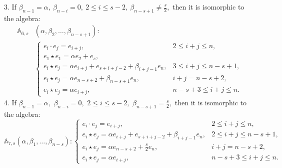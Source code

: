 \documentclass{jonasart}
\begin{document}
\begin{lemma}
		3. If $\beta_{n-1} = \alpha, \ \beta_{n-i} = 0, \ 2 \leq i \leq s-2, \ \beta_{n-s+1} \neq \frac{s}{2},$ then it is isomorphic to the algebra:
        \begin{align*}
			\mathbb{A}_{6,s}&(\alpha,\beta_2,\dots,\beta_{n-s+1}): \\
            &\left\{
			\begin{array}{ll}
				e_i\cdot e_j = e_{i+j}, & 2\leq i+j \leq n, \\[1mm]
				e_1\star e_1 =\alpha e_{2} + e_{s}, \\[1mm]
				e_i\star e_j =\alpha e_{i+j} + e_{s+i+j-2} +\beta_{i+j-1}e_n, & 3\leq i+j \leq n-s+1, \\[1mm]
				e_i\star e_j =\alpha e_{n-s+2} +\beta_{n-s+1}e_n, & i+j = n-s+2, \\[1mm]
				e_i\star e_j =\alpha e_{i+j}, & n-s+3 \leq i+j \leq n.
			\end{array}
			\right.
		\end{align*}
		4. If $\beta_{n-1} = \alpha,$ $\beta_{n-i} = 0,$ $2 \leq i \leq s-2,$ $\beta_{n-s+1}=\frac{s}{2},$ then it is isomorphic to the algebra:
		\[
			\mathbb{A}_{7,s}(\alpha,\beta_1,\dots,\beta_{n-s}):\left\{
			\begin{array}{ll}
				e_i\cdot e_j = e_{i+j}, & 2\leq i+j \leq n, \\[1mm]
				e_i\star e_j =\alpha e_{i+j} + e_{s+i+j-2} +\beta_{i+j-1}e_n, & 2\leq i+j \leq n-s+1, \\[1mm]
				e_i\star e_j =\alpha e_{n-s+2} +\frac{s}{2}e_n, & i+j = n-s+2, \\[1mm]
				e_i\star e_j =\alpha e_{i+j}, & n-s+3 \leq i+j \leq n.
			\end{array}
			\right.
		\]
	\end{lemma}
\end{document}
